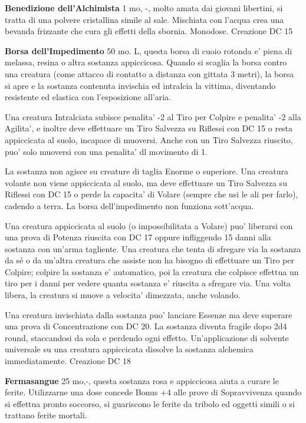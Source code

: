 \documentclass[a4paper,11pt,twoside,openany]{book}
\begin{document}
{		\textbf{Benedizione dell'Alchimista} 1 mo, -, molto amata dai giovani libertini, si tratta di una polvere cristallina simile al sale. Mischiata con l'acqua crea una bevanda frizzante che cura gli effetti della sbornia. Monodose. Creazione DC 15
		
		\textbf{Borsa dell'Impedimento} 50 mo. L, questa borsa di cuoio rotonda e' piena di melassa, resina o altra sostanza appiccicosa. Quando si scaglia la borsa contro una creatura (come attacco di contatto a distanza con gittata 3 metri), la borsa si apre e la sostanza contenuta invischia ed intralcia la vittima, diventando resistente ed elastica con l'esposizione all'aria.
		
		Una creatura Intralciata subisce penalita' -2 al Tiro per Colpire e penalita' -2 alla Agilita', e inoltre deve effettuare un Tiro Salvezza su Riflessi con DC 15 o resta appiccicata al suolo, incapace di muoversi. Anche con un Tiro Salvezza riuscito, puo' solo muoversi con una penalita' dl movimento di 1.
		
		La sostanza non agisce su creature di taglia Enorme o superiore. Una creatura volante non viene appiccicata al suolo, ma deve effettuare un Tiro Salvezza su Riflessi con DC 15 o perde la capacita' di Volare (sempre che usi le ali per farlo), cadendo a terra. La borsa dell'impedimento non funziona sott'acqua.
		
		Una creatura appiccicata al suolo (o impossibilitata a Volare) puo' liberarsi con una prova di Potenza riuscita con DC 17 oppure infliggendo 15 danni alla sostanza con un'arma tagliente. Una creatura che tenta di sfregare via la sostanza da sé o da un'altra creatura che assiste non ha bisogno di effettuare un Tiro per Colpire; colpire la sostanza e' automatico, poi la creatura che colpisce effettua un tiro per i danni per vedere quanta sostanza e' riuscita a sfregare via. Una volta libera, la creatura si muove a velocita' dimezzata, anche volando.
		
		Una creatura invischiata dalla sostanza puo' lanciare Essenze ma deve superare una prova di Concentrazione con DC 20. La sostanza diventa fragile dopo 2d4 round, staccandosi da sola e perdendo ogni effetto. Un'applicazione di solvente universale su una creatura appiccicata dissolve la sostanza alchemica immediatamente. Creazione DC 18
		
		\textbf{Fermasangue} 25 mo,-, questa sostanza rosa e appiccicosa aiuta a curare le ferite. Utilizzarne una dose concede Bonus +4 alle prove di Sopravvivenza quando si effettua pronto soccorso, si guariscono le ferite da tribolo ed oggetti simili o si trattano ferite mortali. 
		
}
\end{document}
